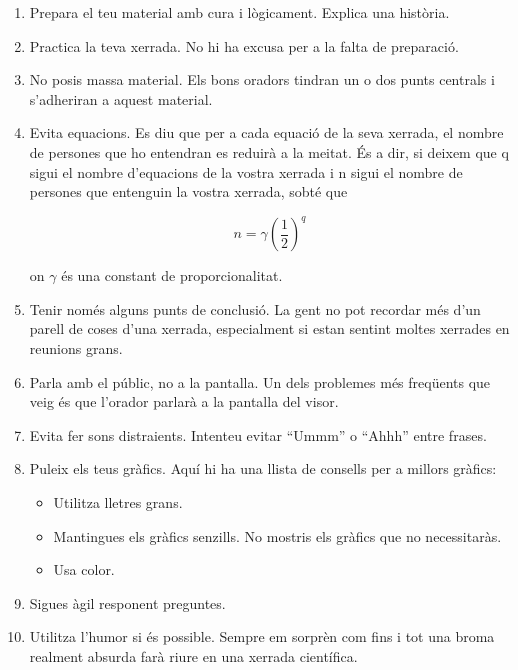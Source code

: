 \documentclass[12pt]{article}
\begin{document}
\begin{enumerate}

\item Prepara el teu material amb cura i lògicament. Explica una història.

\item Practica la teva xerrada. No hi ha excusa per a la falta de preparació.

\item No posis massa material. Els bons oradors tindran un o dos punts centrals i s'adheriran a aquest material.

\item Evita equacions. Es diu que per a cada equació de la seva xerrada, el nombre de persones que ho entendran es reduirà a la meitat. És a dir, si deixem que q sigui el nombre d'equacions de la vostra xerrada i n sigui el nombre de persones que entenguin la vostra xerrada, sobté que

\begin{equation}
n = \gamma \left( \frac{1}{2} \right)^q
\end{equation}

on $\gamma$ és una constant de proporcionalitat.

\item Tenir només alguns punts de conclusió. La gent no pot recordar més d'un parell de coses d'una xerrada, especialment si estan sentint moltes xerrades en reunions grans.

\item Parla amb el públic, no a la pantalla. Un dels problemes més freqüents que veig és que l'orador parlarà a la pantalla del visor.

\item Evita fer sons distraients. Intenteu evitar ``Ummm'' o ``Ahhh'' entre frases.

\item Puleix els teus gràfics. Aquí hi ha una llista de consells per a millors gràfics:

\begin{itemize}

    \item Utilitza lletres grans.

    \item Mantingues els gràfics senzills. No mostris els gràfics que no necessitaràs.

    \item Usa color.

\end{itemize}

\item Sigues àgil responent preguntes.

\item Utilitza l'humor si és possible. Sempre em sorprèn com fins i tot una broma realment absurda farà riure en una xerrada científica.

\end{enumerate}
\end{document}
